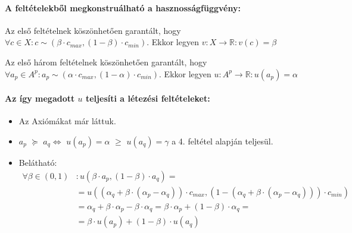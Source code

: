 \documentclass[a4paper,12pt]{article}
\begin{document}
\paragraph{A feltételekből megkonstruálható a hasznosságfüggvény: }

Az első feltételnek köszönhetően garantált, hogy $\forall c \in X: c \sim (\beta \cdot c_{max}, (1-\beta) \cdot c_{min})$. Ekkor legyen $v: X \rightarrow \mathbb{R} : v(c) = \beta$


Az első három feltételnek köszönhetően garantált, hogy $\forall a_p \in A^p: a_p \sim (\alpha \cdot c_{max}, (1-\alpha)\cdot c_{min})$. Ekkor legyen $u: A^p \rightarrow \mathbb{R} : u(a_p) = \alpha$ 


\paragraph{Az így megadott $u$ teljesíti a létezési feltételeket: }
\begin{itemize}
\item Az Axiómákat már láttuk. 
\item $a_p$  $\succeq$ $a_q \Leftrightarrow $ $u(a_p) = \alpha$  $\geq$ $u(a_q) = \gamma$ a 4. feltétel alapján teljesül.
\item Belátható: \begin{equation}
\begin{split} 
\forall  \beta \in (0,1)&: u(\beta\cdot a_p , (1-\beta)\cdot a_q ) = \\
 & = u((\alpha_q + \beta\cdot (\alpha_p - \alpha_q ))\cdot c_{max},(1 - (\alpha_q + \beta\cdot (\alpha_p - \alpha_q )))\cdot c_{min}) \\
 & = \alpha_q + \beta\cdot \alpha_p - \beta\cdot \alpha_q = \beta\cdot \alpha_p + (1-\beta) \cdot  \alpha_q = \\
 & =  \beta\cdot u(a_p) + (1-\beta)\cdot u(a_q)\\
\end{split}
\end{equation} 
\end{itemize}
\end{document}
